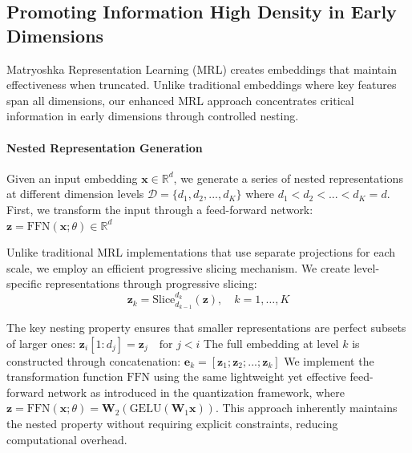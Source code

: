 \subsection{Promoting Information High Density in Early Dimensions}
\label{subsec:matryoshka_and_control}
Matryoshka Representation Learning (MRL) creates embeddings that maintain effectiveness when truncated. Unlike traditional embeddings where key features span all dimensions, our enhanced MRL approach concentrates critical information in early dimensions through controlled nesting.
\paragraph{Nested Representation Generation}
Given an input embedding $\mathbf{x} \in \mathbb{R}^d$, we generate a series of nested representations at different dimension levels $\mathcal{D} = \{d_1, d_2, ..., d_K\}$ where $d_1 < d_2 < ... < d_K = d$. 
First, we transform the input through a feed-forward network: $\mathbf{z} = \text{FFN}(\mathbf{x}; \theta) \in \mathbb{R}^d$

Unlike traditional MRL implementations that use separate projections for each scale, we employ an efficient progressive slicing mechanism.
We create level-specific representations through progressive slicing:
\begin{equation}
    \mathbf{z}_k = \text{Slice}_{d_{k-1}}^{d_k}(\mathbf{z}), \quad k = 1,\ldots,K
\end{equation}

The key nesting property ensures that smaller representations are perfect subsets of larger ones: $\mathbf{z}_i[1:d_j] = \mathbf{z}_j \quad \text{for } j < i$
The full embedding at level $k$ is constructed through concatenation: $\mathbf{e}_k = [\mathbf{z}_1; \mathbf{z}_2; ...; \mathbf{z}_k]$
We implement the transformation function $\text{FFN}$ using the same lightweight yet effective feed-forward network as introduced in the quantization framework, where $\mathbf{z} = \text{FFN}(\mathbf{x}; \theta) = \mathbf{W}_2(\text{GELU}(\mathbf{W}_1\mathbf{x}))$. 
This approach inherently maintains the nested property without requiring explicit constraints, reducing computational overhead.

